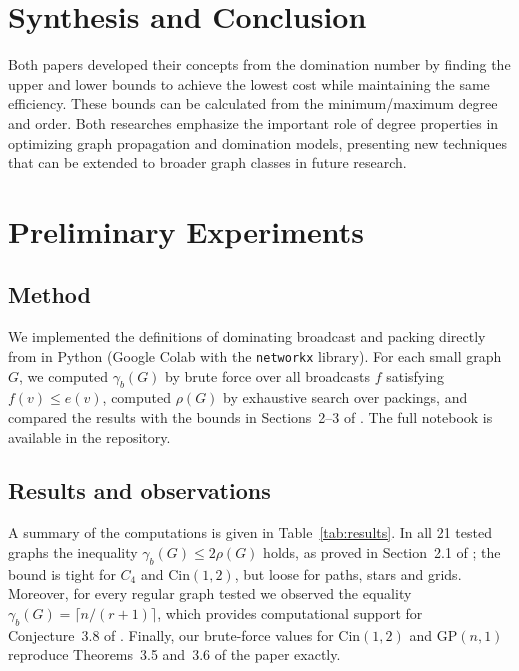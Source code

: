 \documentclass[12pt, a4paper]{article}
\begin{document}
\section{Synthesis and Conclusion}
Both papers developed their concepts from the domination number by finding the upper and lower bounds to achieve the lowest cost while maintaining the same efficiency. These bounds can be calculated from the minimum/maximum degree and order. Both researches emphasize the important role of degree properties in optimizing graph propagation and domination models, presenting new techniques that can be extended to broader graph classes in future research.

\section{Preliminary Experiments}
\label{sec:exp}

\subsection{Method}
We implemented the definitions of dominating broadcast and packing directly from \cite{paper1} in Python (Google Colab with the \texttt{networkx} library). For each small graph $G$, we computed $\gamma_b(G)$ by brute force over all broadcasts $f$ satisfying $f(v) \le e(v)$, computed $\rho(G)$ by exhaustive search over packings, and compared the results with the bounds in Sections~2--3 of \cite{paper1}. The full notebook is available in the repository.

\subsection{Results and observations}
A summary of the computations is given in Table~\ref{tab:results}. In all 21 tested graphs the inequality $\gamma_b(G) \le 2\rho(G)$ holds, as proved in Section~2.1 of \cite{paper1}; the bound is tight for $C_4$ and $\mathrm{Cin}(1,2)$, but loose for paths, stars and grids. Moreover, for every regular graph tested we observed the equality $\gamma_b(G) = \lceil n/(r+1) \rceil$, which provides computational support for Conjecture~3.8 of \cite{paper1}. Finally, our brute-force values for $\mathrm{Cin}(1,2)$ and $\mathrm{GP}(n,1)$ reproduce Theorems~3.5 and~3.6 of the paper exactly.
\end{document}
